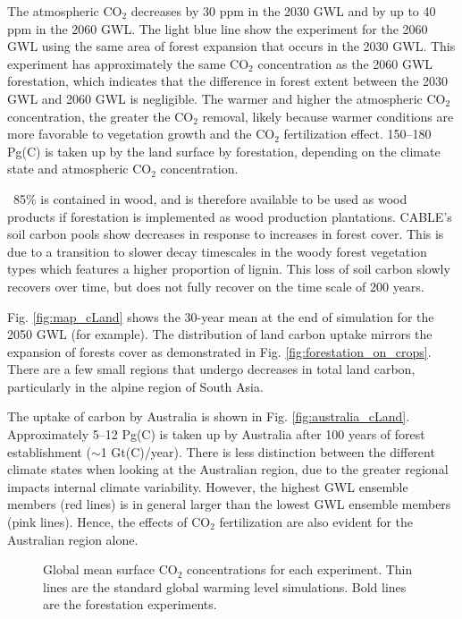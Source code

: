 \documentclass[]{article}
\begin{document}
The atmospheric CO$_2$ decreases by 30 ppm in the 2030 GWL and by up to 40 ppm in the 2060 GWL.
The light blue line show the experiment for the 2060 GWL using the same area of forest expansion that occurs in the 2030 GWL. This experiment has approximately the same CO$_2$ concentration as the 2060 GWL forestation, which indicates that the difference in forest extent between the 2030 GWL and 2060 GWL is negligible.
The warmer and higher the atmospheric CO$_2$ concentration, the greater the CO$_2$ removal, likely because warmer conditions are more favorable to vegetation growth and the CO$_2$ fertilization effect.
150–180 Pg(C) is taken up by the land surface by forestation, depending on the climate state and atmospheric CO$_2$ concentration.

~85\% is contained in wood, and is therefore available to be used as wood products if forestation is implemented as wood production plantations.
CABLE's soil carbon pools show decreases in response to increases in forest cover.
This is due to a transition to slower decay timescales in the woody forest vegetation types which features a higher proportion of lignin.
This loss of soil carbon slowly recovers over time, but does not fully recover on the time scale of 200 years. 

Fig. \ref{fig:map_cLand} shows the 30-year mean at the end of simulation for the 2050 GWL (for example).
The distribution of land carbon uptake mirrors the expansion of forests cover as demonstrated in Fig. \ref{fig:forestation_on_crops}.
There are a few small regions that undergo decreases in total land carbon, particularly in the alpine region of South Asia.

The uptake of carbon by Australia is shown in Fig. \ref{fig:australia_cLand}.
Approximately 5–12 Pg(C) is taken up by Australia after 100 years of forest establishment ($\sim$1 Gt(C)/year).
There is less distinction between the different climate states when looking at the Australian region, due to the greater regional impacts internal climate variability.
However, the highest GWL ensemble members (red lines) is in general larger than the lowest GWL ensemble members (pink lines).
Hence, the effects of CO$_2$ fertilization are also evident for the Australian region alone.

\begin{figure}[H]
    \centering
    \begin{subfigure}[b]{\linewidth}
        
    \end{subfigure}
    \caption{Global mean surface CO$_2$ concentrations for each experiment. Thin lines are the standard global warming level simulations. Bold lines are the forestation experiments.}
    \label{fig:global_co2}
\end{figure}
\end{document}
